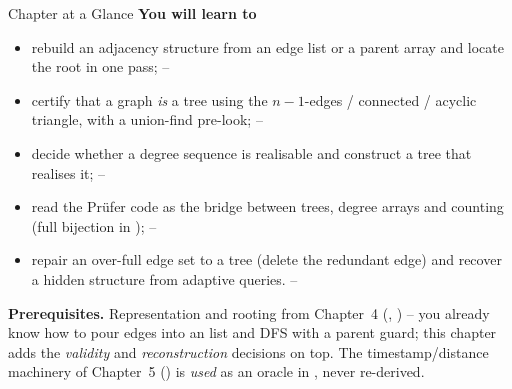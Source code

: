 \begin{chaptertheorybox}{Chapter at a Glance}
\textbf{You will learn to}
\begin{itemize}[nosep]
  \item rebuild an adjacency structure from an edge list or a parent array and locate the root
        in one pass; \hfill{}--
  \item certify that a graph \emph{is} a tree using the $n-1$-edges / connected / acyclic
        triangle, with a union-find pre-look; \hfill{}--
  \item decide whether a degree sequence is realisable and construct a tree that realises it;
        \hfill{}--
  \item read the Pr\"ufer code as the bridge between trees, degree arrays and counting
        (full bijection in ); \hfill{}--
  \item repair an over-full edge set to a tree (delete the redundant edge) and recover a hidden
        structure from adaptive queries. \hfill{}--
\end{itemize}

\textbf{Prerequisites.} Representation and rooting from Chapter~4 (,
) -- you already know how to pour edges into an  list and DFS with a
parent guard; this chapter adds the \emph{validity} and \emph{reconstruction} decisions on top.
The timestamp/distance machinery of Chapter~5 () is \emph{used} as an oracle in
, never re-derived.
\end{chaptertheorybox}

